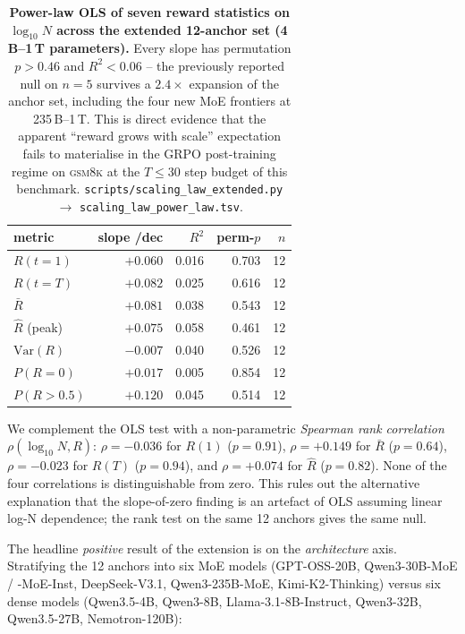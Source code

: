 \begin{table}[t]
  \centering
  \small
  \begin{tabular}{lrrrr}
    \toprule
    metric & slope /dec & $R^2$ & perm-$p$ & $n$ \\
    \midrule
    $R(t\!=\!1)$           & $+0.060$ & 0.016 & 0.703 & 12 \\
    $R(t\!=\!T)$           & $+0.082$ & 0.025 & 0.616 & 12 \\
    $\bar R$                & $+0.081$ & 0.038 & 0.543 & 12 \\
    $\hat R$ (peak)         & $+0.075$ & 0.058 & 0.461 & 12 \\
    $\text{Var}(R)$         & $-0.007$ & 0.040 & 0.526 & 12 \\
    $P(R{=}0)$              & $+0.017$ & 0.005 & 0.854 & 12 \\
    $P(R{>}0.5)$            & $+0.120$ & 0.045 & 0.514 & 12 \\
    \bottomrule
  \end{tabular}
  \caption{\textbf{Power-law OLS of seven reward statistics on
    $\log_{10} N$ across the extended 12-anchor set
    (4\,B--1\,T parameters).}  Every slope has
    permutation $p > 0.46$ and $R^2 < 0.06$ -- the previously
    reported null on $n = 5$ survives a $2.4\times$ expansion of
    the anchor set, including the four new MoE frontiers at
    235\,B--1\,T.  This is direct evidence that the apparent
    ``reward grows with scale'' expectation fails to materialise in
    the GRPO post-training regime on \textsc{gsm8k} at the
    $T \le 30$ step budget of this benchmark.  \texttt{scripts/scaling\_law\_extended.py}
    $\to$ \texttt{scaling\_law\_power\_law.tsv}.}
  \label{tab:scaling-powerlaw}
\end{table}

We complement the OLS test with a non-parametric
\emph{Spearman rank correlation} $\rho(\log_{10}N, R)$:
$\rho = -0.036$ for $R(1)$ ($p = 0.91$), $\rho = +0.149$ for
$\bar R$ ($p = 0.64$), $\rho = -0.023$ for $R(T)$ ($p = 0.94$),
and $\rho = +0.074$ for $\hat R$ ($p = 0.82$).  None of the four
correlations is distinguishable from zero.  This rules out the
alternative explanation that the slope-of-zero finding is an
artefact of OLS assuming linear log-N dependence; the rank test
on the same 12 anchors gives the same null.

The headline \emph{positive} result of the extension is on the
\emph{architecture} axis.  Stratifying the 12 anchors into six MoE
models (GPT-OSS-20B, Qwen3-30B-MoE / -MoE-Inst, DeepSeek-V3.1,
Qwen3-235B-MoE, Kimi-K2-Thinking) versus six dense models
(Qwen3.5-4B, Qwen3-8B, Llama-3.1-8B-Instruct, Qwen3-32B,
Qwen3.5-27B, Nemotron-120B):

